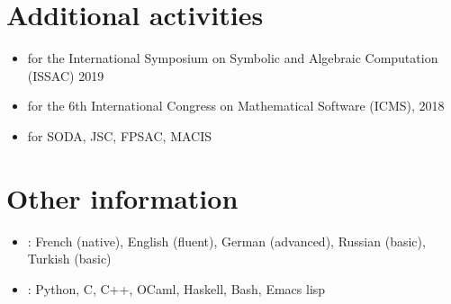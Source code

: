\documentclass{scrartcl}
\begin{document}

\section*{Additional activities}

\begin{itemize}
  \item {} for the International Symposium on Symbolic and Algebraic Computation (ISSAC) 2019
  \item {} for the 6th International Congress on Mathematical Software (ICMS), 2018
  \item {} for SODA, JSC, FPSAC, MACIS
\end{itemize}

\section*{Other information}

\begin{itemize}
  \item {}: French (native), English (fluent), German (advanced), Russian (basic), \\Turkish (basic)
  \item {}: Python, C, C++, OCaml, Haskell, Bash, Emacs lisp
\end{itemize}

\end{document}
